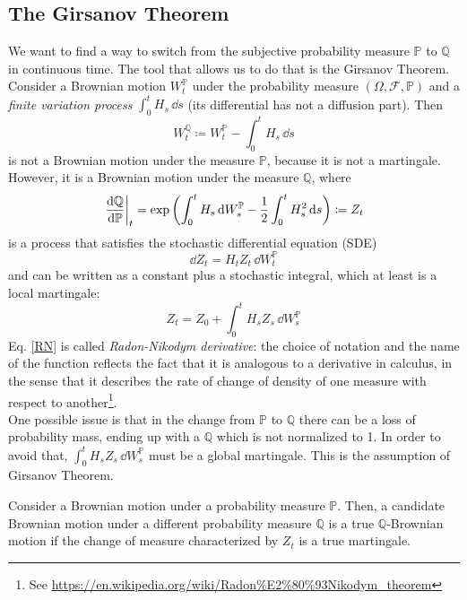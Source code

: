 \subsection{The Girsanov Theorem} %
We want to find a way to switch from the subjective probability measure $\mathbb{P}$ to $\mathbb{Q}$ in continuous time. The tool that allows us to do that is the Girsanov Theorem.\\
Consider a Brownian motion $W_t^{\mathbb{P}}$ under the probability measure $(\Omega, \mathcal{F}, \mathbb{P})$ and a \emph{finite variation process} $\int^t_0 H_s\,\dd s$ (its differential has not a diffusion part). Then
\begin{equation}
    W_t^{\mathbb{Q}} \coloneqq W_t^{\mathbb{P}} - \int^t_0 H_s\,\dd s
\end{equation}
is not a Brownian motion under the measure $\mathbb{P}$, because it is not a martingale. However, it is a Brownian motion under the measure $\mathbb{Q}$, where
\begin{equation}\label{RN}
    \eval{\dv{\mathbb{Q}}{\mathbb{P}}}_t = \exp\left(\int^t_0 H_s\,\dd W_s^{\mathbb{P}}-\dfrac{1}{2}\int^t_0 H_s^2\,\dd s\right) \coloneqq Z_t
\end{equation}
is a process that satisfies the stochastic differential equation (SDE)
\begin{equation}
    \dd Z_t = H_t Z_t\,\dd W_t^\mathbb{P}
\end{equation}
and can be written as a constant plus a stochastic integral, which at least is a local martingale:
\begin{equation}
    Z_t = Z_0 + \int_0^t H_s Z_s\,\dd W_s^{\mathbb{P}}
\end{equation}
Eq. \eqref{RN} is called \emph{Radon-Nikodym derivative}: the choice of notation and the name of the function reflects the fact that it is analogous to a derivative in calculus, in the sense that it describes the rate of change of density of one measure with respect to another\footnote{See \url{https://en.wikipedia.org/wiki/Radon\%E2\%80\%93Nikodym_theorem}}. \\
One possible issue is that in the change from $\mathbb{P}$ to $\mathbb{Q}$ there can be a loss of probability mass, ending up with a $\mathbb{Q}$ which is not normalized to 1. In order to avoid that, $\int_0^t H_s Z_s\,\dd W_s^{\mathbb{P}}$ must be a global martingale. This is the assumption of Girsanov Theorem.
\begin{theorem}
    Consider a Brownian motion under a probability measure $\mathbb{P}$. Then, a candidate Brownian motion under a different probability measure $\mathbb{Q}$ is a true $\mathbb{Q}$-Brownian motion if the change of measure characterized by $Z_t$ is a true martingale.
\end{theorem}
